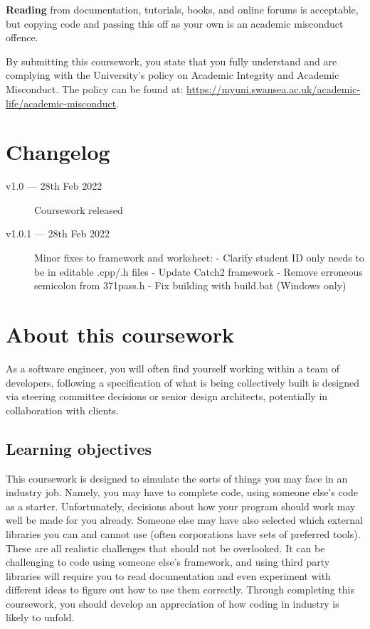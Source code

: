 \documentclass[a4paper]{article}
\begin{document}
\textbf{Reading} from documentation, tutorials, books, and online forums is acceptable, but copying code and passing this off as your own is an academic misconduct offence.

By submitting this coursework, you state that you fully understand and are complying with the University’s policy on Academic Integrity and Academic Misconduct. The policy can be found at: \url{https://myuni.swansea.ac.uk/academic-life/academic-misconduct}.


\section*{Changelog}\label{sec:changelog}
\begin{description}
    \item[v1.0   --- 28th Feb 2022]
			Coursework released
    \item[v1.0.1 --- 28th Feb 2022] Minor fixes to framework and worksheet:\newline
			- Clarify student ID only needs to be in editable .cpp/.h files\newline
		  - Update Catch2 framework\newline
		  - Remove erroneous semicolon from 371pass.h\newline
		  - Fix building with build.bat (Windows only)
\end{description}



\newpage\section*{About this coursework}\label{sec:about}
As a software engineer, you will often find yourself working within a team of developers, following a specification of what is being collectively built is designed via steering committee decisions or senior design architects, potentially in collaboration with clients. 

\subsection*{Learning objectives}
This coursework is designed to simulate the sorts of things you may face in an industry job. Namely, you may have to complete code, using someone else’s code as a starter. Unfortunately, decisions about how your program should work may well be made for you already. Someone else may have also selected which external libraries you can and cannot use (often corporations have sets of preferred tools). These are all realistic challenges that should not be overlooked. It can be challenging to code using someone else’s framework, and using third party libraries will require you to read documentation and even experiment with different ideas to figure out how to use them correctly. Through completing this coursework, you should develop an appreciation of how coding in industry is likely to unfold.
\end{document}
